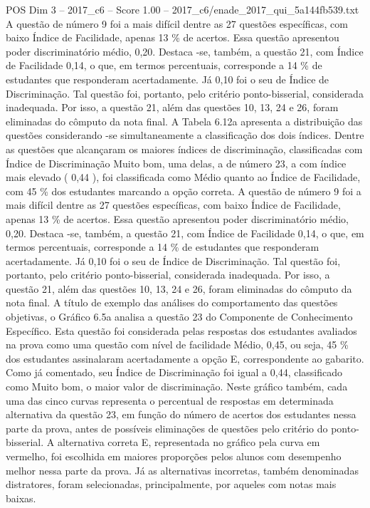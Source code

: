 \begin{textsample}{POS Dim 3 – 2017\_c6 – Score 1.00 – 2017\_c6/enade\_2017\_qui\_5a144fb539.txt}
A questão de número 9 foi a mais difícil dentre as 27 questões específicas, com baixo Índice de Facilidade, apenas 13 \% de acertos.
Essa questão apresentou poder discriminatório médio, 0,20.
Destaca -se, também, a questão 21, com Índice de Facilidade 0,14, o que, em termos percentuais, corresponde a 14 \% de estudantes que responderam acertadamente.
Já 0,10 foi o seu de Índice de Discriminação.
Tal questão foi, portanto, pelo critério ponto-bisserial, considerada inadequada.
Por isso, a questão 21, além das questões 10, 13, 24 e 26, foram eliminadas do cômputo da nota final.
A Tabela 6.12a apresenta a distribuição das questões considerando -se simultaneamente a classificação dos dois índices.
Dentre as questões que alcançaram os maiores índices de discriminação, classificadas com Índice de Discriminação Muito bom, uma delas, a de número 23, a com índice mais elevado ( 0,44 ), foi classificada como Médio quanto ao Índice de Facilidade, com 45 \% dos estudantes marcando a opção correta.
A questão de número 9 foi a mais difícil dentre as 27 questões específicas, com baixo Índice de Facilidade, apenas 13 \% de acertos.
Essa questão apresentou poder discriminatório médio, 0,20.
Destaca -se, também, a questão 21, com Índice de Facilidade 0,14, o que, em termos percentuais, corresponde a 14 \% de estudantes que responderam acertadamente.
Já 0,10 foi o seu de Índice de Discriminação.
Tal questão foi, portanto, pelo critério ponto-bisserial, considerada inadequada.
Por isso, a questão 21, além das questões 10, 13, 24 e 26, foram eliminadas do cômputo da nota final.
A título de exemplo das análises do comportamento das questões objetivas, o Gráfico 6.5a analisa a questão 23 do Componente de Conhecimento Específico.
Esta questão foi considerada pelas respostas dos estudantes avaliados na prova como uma questão com nível de facilidade Médio, 0,45, ou seja, 45 \% dos estudantes assinalaram acertadamente a opção E, correspondente ao gabarito.
Como já comentado, seu Índice de Discriminação foi igual a 0,44, classificado como Muito bom, o maior valor de discriminação.
Neste gráfico também, cada uma das cinco curvas representa o percentual de respostas em determinada alternativa da questão 23, em função do número de acertos dos estudantes nessa parte da prova, antes de possíveis eliminações de questões pelo critério do ponto-bisserial.
A alternativa correta E, representada no gráfico pela curva em vermelho, foi escolhida em maiores proporções pelos alunos com desempenho melhor nessa parte da prova.
Já as alternativas incorretas, também denominadas distratores, foram selecionadas, principalmente, por aqueles com notas mais baixas.

\end{textsample}
